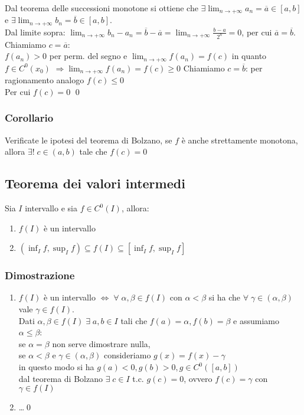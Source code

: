 \documentclass[a4paper]{article}
\newcommand\cont[2]{C^{#1} \left({#2}\right)}
\begin{document}
Dal teorema delle successioni monotone si ottiene che \(\displaystyle \exists \lim_{n \to +\infty} a_n = \overline{a} \in \left[a, b\right]\) e
\(\displaystyle \exists \lim_{n \to +\infty} b_n = \overline{b} \in \left[a, b\right]\).\\
Dal limite sopra: \(\displaystyle \lim_{n \to +\infty} b_n - a_n = \overline{b} - \overline{a} = \lim_{n \to +\infty} \frac{b - a}{2^n} = 0\),
per cui \(\overline{a} = \overline{b}\). \\
Chiamiamo \(c = \overline{a}\): \\
\(f(a_n) > 0\) per perm. del segno e \(\displaystyle \lim_{n \to +\infty}f(a_n) = f(c)\) in quanto \(f \in \cont{0}{x_0}\) \(\displaystyle \Rightarrow \lim_{n \to +\infty} f(a_n) = f(c) \geq 0\) 
Chiamiamo \(c = \overline{b}\): per ragionamento analogo \(f(c) \leq 0\) \\
Per cui \(f(c) = 0\) \qed

\subsubsection*{Corollario}
Verificate le ipotesi del teorema di Bolzano, se \(f\) è anche strettamente monotona, allora \(\exists! \; c \in \left(a, b\right)\) tale che \(f(c) = 0\)

\subsection{Teorema dei valori intermedi}
Sia \(I\) intervallo e sia \(f \in \cont{0}{I}\), allora:
\begin{enumerate}
	\item \(f(I)\) è un intervallo
	\item \(\displaystyle \left(\inf_I f, \sup_I f\right) \subseteq f(I) \subseteq \left[\inf_I f, \sup_I f\right]\)
\end{enumerate}

\subsubsection*{Dimostrazione}
\begin{enumerate}
	\item \(f(I)\) è un intervallo \(\Leftrightarrow \; \forall \; \alpha, \beta \in f(I)\) con \(\alpha < \beta\) si ha che \(\forall \; \gamma \in \left(\alpha, \beta\right)\) vale \(\gamma \in f(I)\). \\
	Dati \(\alpha, \beta \in f(I) \; \exists \; a, b \in I \) tali che \(f(a) = \alpha, f(b) = \beta\) e assumiamo \(\alpha \leq \beta\): \\
	se \(\alpha = \beta\) non serve dimostrare nulla, \\
	se \(\alpha < \beta\) e \(\gamma \in \left(\alpha, \beta\right)\) consideriamo \(g(x) = f(x) - \gamma\) \\
	in questo modo si ha \(g(a) < 0, g(b) > 0, g \in \cont{0}{\left[a, b\right]}\) \\
	dal teorema di Bolzano \(\exists \; c \in I\) t.c. \(g(c) = 0\), ovvero \(f(c) = \gamma\) con \(\gamma \in f(I)\)
	\item \dots \qed
\end{enumerate}
\end{document}
